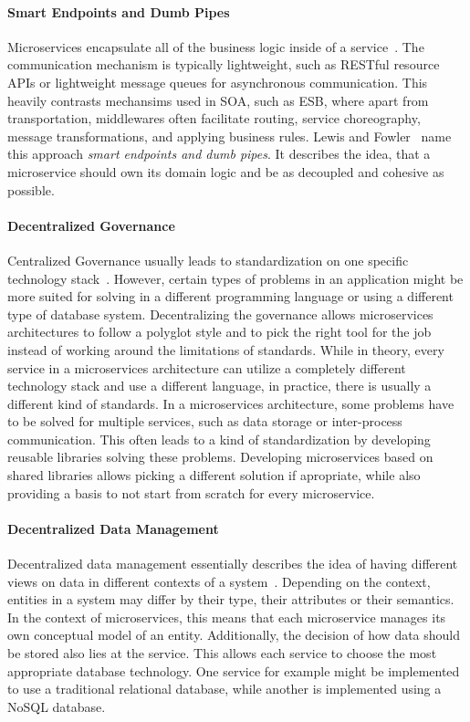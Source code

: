 \paragraph{Smart Endpoints and Dumb Pipes}

Microservices encapsulate all of the business logic inside of a service~\cite{Lewis2014}.
The communication mechanism is typically lightweight, such as \ac{REST}ful resource \acp{API} or lightweight message queues for asynchronous communication.
This heavily contrasts mechansims used in \ac{SOA}, such as \ac{ESB}, where apart from transportation, middlewares often facilitate routing, service choreography, message transformations, and applying business rules.
Lewis and Fowler~\cite{Lewis2014} name this approach \textit{smart endpoints and dumb pipes}.
It describes the idea, that a microservice should own its domain logic and be as decoupled and cohesive as possible.

\paragraph{Decentralized Governance}

Centralized Governance usually leads to standardization on one specific technology stack~\cite{Lewis2014}.
However, certain types of problems in an application might be more suited for solving in a different programming language or using a different type of database system.
Decentralizing the governance allows microservices architectures to follow a polyglot style and to pick the right tool for the job instead of working around the limitations of standards.
While in theory, every service in a microservices architecture can utilize a completely different technology stack and use a different language, in practice, there is usually a different kind of standards.
In a microservices architecture, some problems have to be solved for multiple services, such as data storage or inter-process communication.
This often leads to a kind of standardization by developing reusable libraries solving these problems.
Developing microservices based on shared libraries allows picking a different solution if apropriate, while also providing a basis to not start from scratch for every microservice.


\paragraph{Decentralized Data Management}

Decentralized data management essentially describes the idea of having different views on data in different contexts of a system~\cite{Lewis2014}.
Depending on the context, entities in a system may differ by their type, their attributes or their semantics.
In the context of microservices, this means that each microservice manages its own conceptual model of an entity.
Additionally, the decision of how data should be stored also lies at the service.
This allows each service to choose the most appropriate database technology.
One service for example might be implemented to use a traditional relational database, while another is implemented using a NoSQL database.

